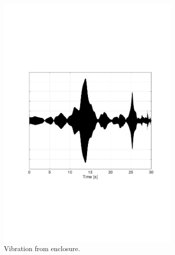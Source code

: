 \begin{figure}[H]
\begin{subfigure}[t]{0.3\textwidth}
	\includegraphics[width=1\textwidth]{figures/raw_enclosure19.pdf}
	\caption{Vibration from enclosure.}
	\label{fig:raw_enclosure19}
\end{subfigure}
\begin{subfigure}[t]{0.3\textwidth}

\end{subfigure}
\end{figure}
